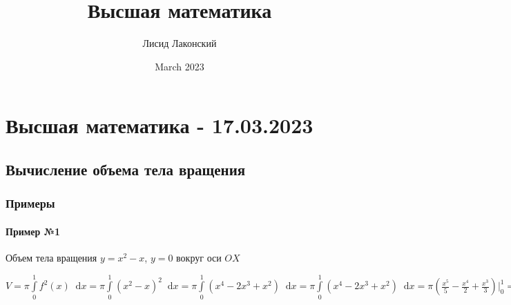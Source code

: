 \documentclass{article}
\title{Высшая математика}
\author{Лисид Лаконский}
\date{March 2023}
\newcommand*\diff{\mathop{}\!\mathrm{d}}
\begin{document}
\raggedright

\maketitle

\tableofcontents
\pagebreak

\section{Высшая математика - 17.03.2023}

\subsection{Вычисление объема тела вращения}

\subsubsection{Примеры}

\paragraph{Пример №1} Объем тела вращения $y = x^2 - x$, $y = 0$ вокруг оси $OX$

$V = \pi \int\limits_{0}^{1} f^2(x) \diff x = \pi \int\limits_{0}^{1} (x^2-x)^2 \diff x = \pi \int\limits_{0}^{1} (x^4 - 2x^3 + x^2) \diff x = \pi \int\limits_{0}^{1} (x^4 - 2x^3 + x^2) \diff x = \pi (\frac{x^5}{5} - \frac{x^4}{2} + \frac{x^3}{3}) \bigg|_{0}^{1} = \pi (\frac{1}{5} - \frac{1}{2} + \frac{1}{3}) = \frac{\pi}{30}$
\end{document}
